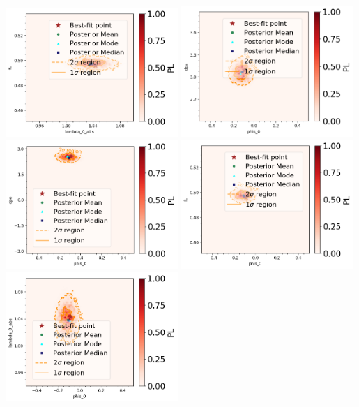 \begin{center}
\includegraphics[width=0.49\textwidth]{figs/lambda_0_abs_vs_fL.png}
\includegraphics[width=0.49\textwidth]{figs/phis_0_vs_dpa.png}\\
\includegraphics[width=0.49\textwidth]{figs/phis_0_vs_dpe.png}
\includegraphics[width=0.49\textwidth]{figs/phis_0_vs_fL.png}\\
\includegraphics[width=0.49\textwidth]{figs/phis_0_vs_lambda_0_abs.png}
\label{fig:phisMN2D}
\end{center}

